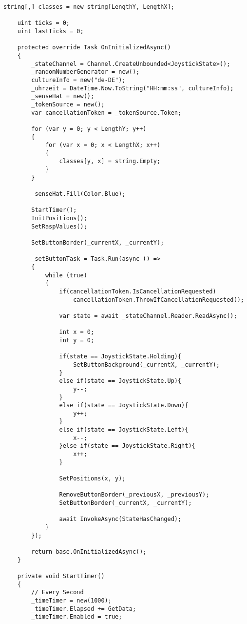 \begin{lstlisting}[language={[Sharp]C}, caption=Kompletter Demo Code,
	label=lst:DemoCode]
    string[,] classes = new string[LengthY, LengthX];

    uint ticks = 0;
    uint lastTicks = 0;

    protected override Task OnInitializedAsync()
    {
        _stateChannel = Channel.CreateUnbounded<JoystickState>();
        _randomNumberGenerator = new();
        cultureInfo = new("de-DE");
        _uhrzeit = DateTime.Now.ToString("HH:mm:ss", cultureInfo);
        _senseHat = new();
        _tokenSource = new();
        var cancellationToken = _tokenSource.Token;

        for (var y = 0; y < LengthY; y++)
        {
            for (var x = 0; x < LengthX; x++)
            {
                classes[y, x] = string.Empty;
            }
        }

        _senseHat.Fill(Color.Blue);

        StartTimer();
        InitPositions();
        SetRaspValues();

        SetButtonBorder(_currentX, _currentY);

        _setButtonTask = Task.Run(async () =>
        {
            while (true)
            {
                if(cancellationToken.IsCancellationRequested)
                    cancellationToken.ThrowIfCancellationRequested();

                var state = await _stateChannel.Reader.ReadAsync();

                int x = 0;
                int y = 0;

                if(state == JoystickState.Holding){
                    SetButtonBackground(_currentX, _currentY);
                }
                else if(state == JoystickState.Up){
                    y--;
                }
                else if(state == JoystickState.Down){
                    y++;
                }
                else if(state == JoystickState.Left){
                    x--;
                }else if(state == JoystickState.Right){
                    x++;
                }

                SetPositions(x, y);

                RemoveButtonBorder(_previousX, _previousY);
                SetButtonBorder(_currentX, _currentY);

                await InvokeAsync(StateHasChanged);
            }
        });

        return base.OnInitializedAsync();
    }

    private void StartTimer()
    {
        // Every Second
        _timeTimer = new(1000);
        _timeTimer.Elapsed += GetData;
        _timeTimer.Enabled = true;


\end{lstlisting}
